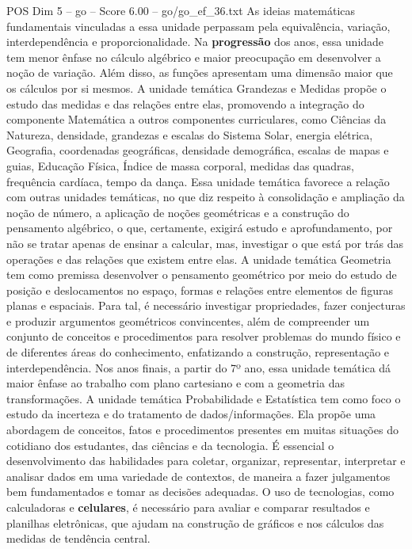 \begin{textsample}{POS Dim 5 – go – Score 6.00 – go/go\_ef\_36.txt}
As ideias matemáticas fundamentais vinculadas a essa unidade perpassam pela equivalência, variação, interdependência e proporcionalidade.
Na \textbf{progressão} dos anos, essa unidade tem menor ênfase no cálculo algébrico e maior preocupação em desenvolver a noção de variação.
Além disso, as funções apresentam uma dimensão maior que os cálculos por si mesmos.
A unidade temática Grandezas e Medidas propõe o estudo das medidas e das relações entre elas, promovendo a integração do componente Matemática a outros componentes curriculares, como Ciências da Natureza, densidade, grandezas e escalas do Sistema Solar, energia elétrica, Geografia, coordenadas geográficas, densidade demográfica, escalas de mapas e guias, Educação Física, Índice de massa corporal, medidas das quadras, frequência cardíaca, tempo da dança.
Essa unidade temática favorece a relação com outras unidades temáticas, no que diz respeito à consolidação e ampliação da noção de número, a aplicação de noções geométricas e a construção do pensamento algébrico, o que, certamente, exigirá estudo e aprofundamento, por não se tratar apenas de ensinar a calcular, mas, investigar o que está por trás das operações e das relações que existem entre elas.
A unidade temática Geometria tem como premissa desenvolver o pensamento geométrico por meio do estudo de posição e deslocamentos no espaço, formas e relações entre elementos de figuras planas e espaciais.
Para tal, é necessário investigar propriedades, fazer conjecturas e produzir argumentos geométricos convincentes, além de compreender um conjunto de conceitos e procedimentos para resolver problemas do mundo físico e de diferentes áreas do conhecimento, enfatizando a construção, representação e interdependência.
Nos anos finais, a partir do 7º ano, essa unidade temática dá maior ênfase ao trabalho com plano cartesiano e com a geometria das transformações.
A unidade temática Probabilidade e Estatística tem como foco o estudo da incerteza e do tratamento de dados/informações.
Ela propõe uma abordagem de conceitos, fatos e procedimentos presentes em muitas situações do cotidiano dos estudantes, das ciências e da tecnologia.
É essencial o desenvolvimento das habilidades para coletar, organizar, representar, interpretar e analisar dados em uma variedade de contextos, de maneira a fazer julgamentos bem fundamentados e tomar as decisões adequadas.
O uso de tecnologias, como calculadoras e \textbf{celulares}, é necessário para avaliar e comparar resultados e planilhas eletrônicas, que ajudam na construção de gráficos e nos cálculos das medidas de tendência central.

\end{textsample}
